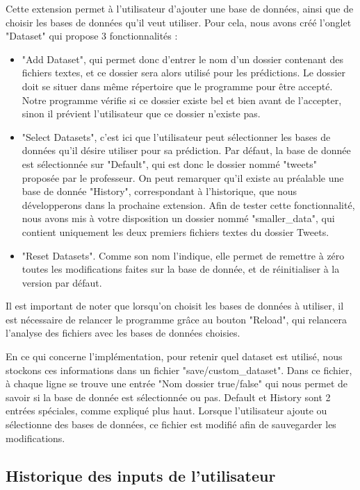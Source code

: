 \documentclass{article}
\begin{document}
Cette extension permet à l'utilisateur d'ajouter une base de données, ainsi que de choisir les bases de données qu'il veut utiliser. Pour cela, nous avons créé l'onglet "Dataset" qui propose 3 fonctionnalités :
\begin{itemize}
    \item "Add Dataset", qui permet donc d'entrer le nom d'un dossier contenant des fichiers textes, et ce dossier sera alors utilisé pour les prédictions. Le dossier doit se situer dans même répertoire que le programme pour être accepté. Notre programme vérifie si ce dossier existe bel et bien avant de l'accepter, sinon il prévient l'utilisateur que ce dossier n'existe pas.
    \item "Select Datasets", c'est ici que l'utilisateur peut sélectionner les bases de données qu'il désire utiliser pour sa prédiction. Par défaut, la base de donnée est sélectionnée sur "Default", qui est donc le dossier nommé "tweets" proposée par le professeur. On peut remarquer qu'il existe au préalable une base de donnée "History", correspondant à l'historique, que nous développerons dans la prochaine extension. Afin de tester cette fonctionnalité, nous avons mis à votre disposition un dossier nommé "smaller\_data", qui contient uniquement les deux premiers fichiers textes du dossier Tweets.
    \item "Reset Datasets". Comme son nom l'indique, elle permet de remettre à zéro toutes les modifications faites sur la base de donnée, et de réinitialiser à la version par défaut.
\end{itemize}

Il est important de noter que lorsqu'on choisit les bases de données à utiliser, il est nécessaire de relancer le programme grâce au bouton "Reload", qui relancera l'analyse des fichiers avec les bases de données choisies.

En ce qui concerne l'implémentation, pour retenir quel dataset est utilisé, nous stockons ces informations dans un fichier "save/custom\_dataset". Dans ce fichier, à chaque ligne se trouve une entrée "Nom dossier true/false" qui nous permet de savoir si la base de donnée est sélectionnée ou pas. Default et History sont 2 entrées spéciales, comme expliqué plus haut. Lorsque l'utilisateur ajoute ou sélectionne des bases de données, ce fichier est modifié afin de sauvegarder les modifications.

\subsection{Historique des inputs de l’utilisateur}
\end{document}
